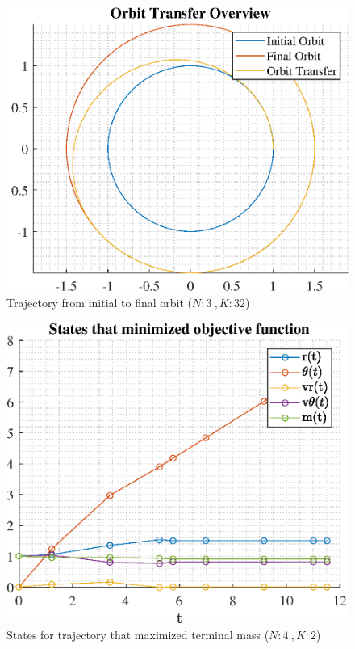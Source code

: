 \documentclass[]{article}
\begin{document}
\begin{figure}
	\centering
	\includegraphics[scale=0.75]{orbit_N3_K32_C2_mf.eps}
	\caption{Trajectory from initial to final orbit (\(N:3\ , K:32\))}
	\label{fig:orbit_N3_K32_C2_mf}
\end{figure}
\begin{figure}
	\centering
	\includegraphics[scale=0.75]{states_N4_K2_C2_mf.eps}
	\caption{States for trajectory that maximized terminal mass (\(N:4\ , K:2\))}
	\label{fig:states_N4_K2_C2_mf}
\end{figure}
\end{document}
